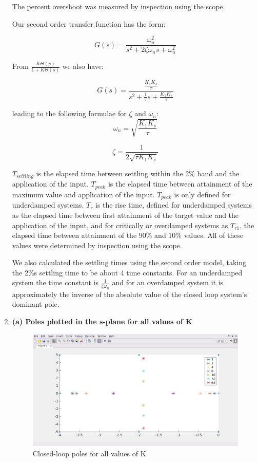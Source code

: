 \documentclass[11pt,a4paper]{article}
\begin{document}
\begin{enumerate}
The percent overshoot was measured by inspection using the scope.

 Our second order transfer function has the form:

\begin{equation}
	G(s) = \frac{\omega_{n}^{2}}{s^{2}+2\zeta\omega_{n}s+\omega_{n}^{2}}
\end{equation}

From $\frac{K\Theta(s)}{1+K\Theta(s)}$ we also have:

\begin{equation}
	G(s) = \frac{\frac{K_{1}K_{s}}{\tau}}{s^{2}+\frac{1}{\tau}s+\frac{K_{1}K_{s}}{\tau}}
\end{equation}


leading to the following formulae for $\zeta$ and $\omega_{n}$:
\begin{equation}
	\omega_{n} = \sqrt{\frac{K_{1}K_{s}}{\tau}}
\end{equation}

\begin{equation}
	\zeta = \frac{1}{2\sqrt{\tau K_{1} K_{s}}}
\end{equation}


$T_{settling}$ is the elapsed time between settling within the 2\% band and the application of the input. $T_{peak}$ is the elapsed time between attainment of the maximum value and application of the input. $T_{peak}$ is only defined for underdamped systems. $T_{r}$ is the rise time, defined for underdamped systems as the elapsed time between first attainment of the target value and the application of the input, and for critically or overdamped systems as $T_{r1}$, the elapsed time between attainment of the 90\% and 10\% values. All of these values were determined by inspection using the scope. 

We also calculated the settling times using the second order model, taking the 2\%s settling time to be about 4 time constants. For an underdamped system the time constant is $\frac{1}{\zeta \omega_{n}}$ and for an overdamped system it is approximately the inverse of the absolute value of the closed loop system's dominant pole.


\item \textbf{(a) Poles plotted in the s-plane for all values of K}

\begin{figure}[H]
\includegraphics[width=\textwidth]{imglab/lab2sol_ex2a.png}
\caption{Closed-loop poles for all values of K. }
\label{fig:ex2a}
\end{figure}


\end{enumerate}
\end{document}
